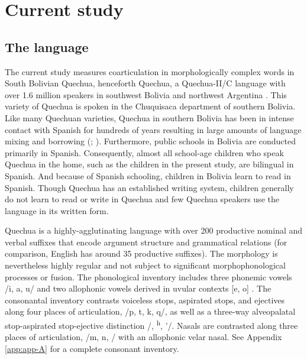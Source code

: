 \documentclass[a4paper,man,floatsintext,natbib,donotrepeattitle, apacite]{apa6}
\begin{document}
\section{Current study}

\subsection{The language}\label{the-language}

The current study measures coarticulation in morphologically complex words in South Bolivian Quechua, henceforth Quechua, a Quechua-II/C language with over 1.6 million speakers in southwest Bolivia and northwest Argentina \citep{toreroDialectosQuechuas1964}. This variety of Quechua is spoken in the Chuquisaca department of southern Bolivia. Like many Quechuan varieties, Quechua in southern Bolivia has been in intense contact with Spanish for hundreds of years resulting in large amounts of language mixing and borrowing (\citealt{muyskenContactsIndigenousLanguages2012}; \citealt{muyskenSpanishAffixesQuechua2012}). Furthermore, public schools in Bolivia are conducted primarily in Spanish. Consequently, almost all school-age children who speak Quechua in the home, such as the children in the present study, are bilingual in Spanish. And because of Spanish schooling, children in Bolivia learn to read in Spanish. Though Quechua has an established writing system, children generally do not learn to read or write in Quechua and few Quechua speakers use the language in its written form.

Quechua is a highly-agglutinating language with over 200 productive nominal and verbal suffixes that encode argument structure and grammatical relations (for comparison, English has around 35 productive suffixes). The morphology is nevertheless highly regular and not subject to significant morphophonological processes or fusion. The phonological inventory includes three phonemic vowels /i, a, u/ and two allophonic vowels derived in uvular contexts [e, o] \citep{gallagherVowelHeightAllophony2016}. The consonantal inventory contrasts voiceless stops, aspirated stops, and ejectives along four places of articulation, /p, t, k, q/, as well as a three-way alveopalatal stop-aspirated stop-ejective distinction /\textteshlig, \textteshlig\textsuperscript{h}, \textteshlig'/. Nasals are contrasted along three places of articulation, /m, n, \textltailn/ with an allophonic velar nasal. See Appendix \ref{app:app-A} for a complete consonant inventory. 

~
~
\end{document}
